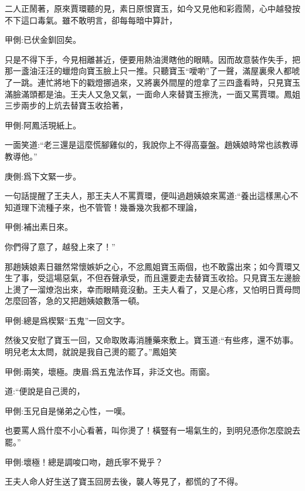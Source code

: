 \begin{parag}
    二人正鬧著，原來賈環聽的見，素日原恨寶玉，如今又見他和彩霞鬧，心中越發按不下這口毒氣。雖不敢明言，卻每每暗中算計，\begin{note}甲側:已伏金釧回矣。\end{note}只是不得下手，今見相離甚近，便要用熱油燙瞎他的眼睛。因而故意裝作失手，把那一盞油汪汪的蠟燈向寶玉臉上只一推。只聽寶玉“噯喲”了一聲，滿屋裏衆人都唬了一跳。連忙將地下的戳燈挪過來，又將裏外間屋的燈拿了三四盞看時，只見寶玉滿臉滿頭都是油。王夫人又急又氣，一面命人來替寶玉擦洗，一面又罵賈環。鳳姐三步兩步的上炕去替寶玉收拾著，\begin{note}甲側:阿鳳活現紙上。\end{note}一面笑道:“老三還是這麼慌腳雞似的，我說你上不得高臺盤。趙姨娘時常也該教導教導他。”\begin{note}庚側:爲下文緊一步。\end{note}一句話提醒了王夫人，那王夫人不罵賈環，便叫過趙姨娘來罵道:“養出這樣黑心不知道理下流種子來，也不管管！幾番幾次我都不理論，\begin{note}甲側:補出素日來。\end{note}你們得了意了，越發上來了！”
\end{parag}


\begin{parag}
    那趙姨娘素日雖然常懷嫉妒之心，不忿鳳姐寶玉兩個，也不敢露出來；如今賈環又生了事，受這場惡氣，不但吞聲承受，而且還要走去替寶玉收拾。只見寶玉左邊臉上燙了一溜燎泡出來，幸而眼睛竟沒動。王夫人看了，又是心疼，又怕明日賈母問怎麼回答，急的又把趙姨娘數落一頓。\begin{note}甲側:總是爲楔緊“五鬼”一回文字。\end{note}然後又安慰了寶玉一回，又命取敗毒消腫藥來敷上。寶玉道:“有些疼，還不妨事。明兒老太太問，就說是我自己燙的罷了。”鳳姐笑\begin{note}甲側:兩笑，壞極。庚眉:爲五鬼法作耳，非泛文也。雨窗。\end{note}道:“便說是自己燙的，\begin{note}甲側:玉兄自是悌弟之心性，一嘆。\end{note}也要罵人爲什麼不小心看著，叫你燙了！橫豎有一場氣生的，到明兒憑你怎麼說去罷。”\begin{note}甲側:壞極！總是調唆口吻，趙氏寧不覺乎？\end{note}王夫人命人好生送了寶玉回房去後，襲人等見了，都慌的了不得。
\end{parag}


